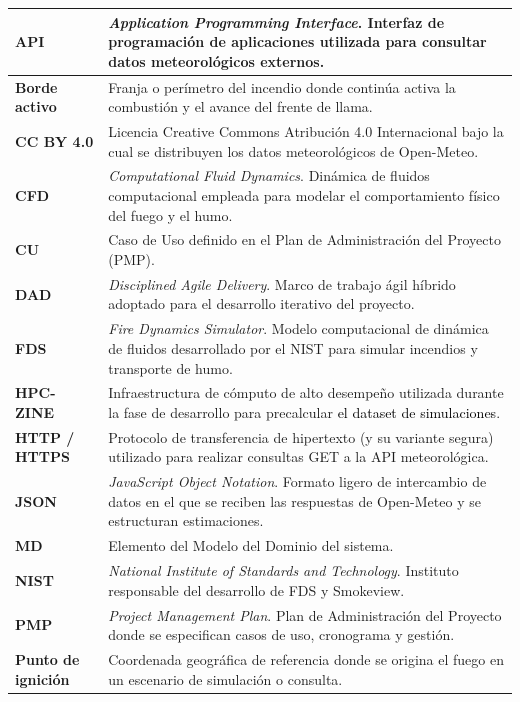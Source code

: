 \begin{longtable}{|p{3.2cm}|p{11.5cm}|}
\textbf{API} & \textit{Application Programming Interface}. Interfaz de programación de aplicaciones utilizada para consultar datos meteorológicos externos. \\ \hline
\textbf{Borde activo} & Franja o perímetro del incendio donde continúa activa la combustión y el avance del frente de llama. \\ \hline
\textbf{CC BY 4.0} & Licencia Creative Commons Atribución 4.0 Internacional bajo la cual se distribuyen los datos meteorológicos de Open-Meteo. \\ \hline
\textbf{CFD} & \textit{Computational Fluid Dynamics}. Dinámica de fluidos computacional empleada para modelar el comportamiento físico del fuego y el humo. \\ \hline
\textbf{CU} & Caso de Uso definido en el Plan de Administración del Proyecto (PMP). \\ \hline
\textbf{DAD} & \textit{Disciplined Agile Delivery}. Marco de trabajo ágil híbrido adoptado para el desarrollo iterativo del proyecto. \\ \hline
\textbf{FDS} & \textit{Fire Dynamics Simulator}. Modelo computacional de dinámica de fluidos desarrollado por el NIST para simular incendios y transporte de humo. \\ \hline
\textbf{HPC-ZINE} & Infraestructura de cómputo de alto desempeño utilizada durante la fase de desarrollo para precalcular \textcolor{black}{el dataset de simulaciones}. \\ \hline
\textbf{HTTP / HTTPS} & Protocolo de transferencia de hipertexto (y su variante segura) utilizado para realizar consultas GET a la API meteorológica. \\ \hline
\textbf{JSON} & \textit{JavaScript Object Notation}. Formato ligero de intercambio de datos en el que se reciben las respuestas de Open-Meteo y se estructuran estimaciones. \\ \hline
\textbf{MD} & Elemento del Modelo del Dominio del sistema. \\ \hline
\textbf{NIST} & \textit{National Institute of Standards and Technology}. Instituto responsable del desarrollo de FDS y Smokeview. \\ \hline
\textbf{PMP} & \textit{Project Management Plan}. Plan de Administración del Proyecto donde se especifican casos de uso, cronograma y gestión. \\ \hline
\textbf{Punto de ignición} & Coordenada geográfica de referencia donde se origina el fuego en un escenario de simulación o consulta. \\ \hline

\end{longtable}
